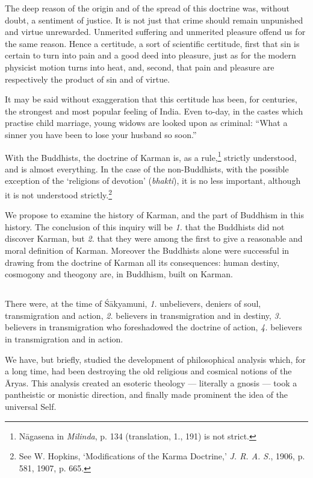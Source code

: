 \documentclass[a4paper, 11pt, oneside, english, landscape]{article}
\begin{document}
The deep reason of the origin and of the spread of this doctrine was, without doubt, a sentiment of justice. It is not just that crime should remain unpunished and virtue unrewarded. Unmerited suffering and unmerited pleasure offend us for the same reason. Hence a certitude, a sort of scientific certitude, first that sin is certain to turn into pain and a good deed into pleasure, just as for the modern physicist motion turns into heat, and, second, that pain and pleasure are respectively the product of sin and of virtue.

It may be said without exaggeration that this certitude has been, for centuries, the strongest and most popular feeling of India. Even to-day, in the castes which practise child marriage, young widows are looked upon as criminal: ``What a sinner you have been to lose your husband so soon.''

With the Buddhists, the doctrine of Karman is, as a rule,\footnote{Nāgasena in \emph{Milinda}, p. 134 (translation, 1., 191) is not strict.} strictly understood, and is almost everything. In the case of the non-Buddhists, with the possible exception of the `religions of devotion' (\emph{bhakti}), it is no less important, although it is not understood strictly.\footnote{See W. Hopkins, `Modifications of the Karma Doctrine,' \emph{J. R. A. S.}, 1906, p. 581, 1907, p. 665.}

We propose to examine the history of Karman, and the part of Buddhism in this history. The conclusion of this inquiry will be \emph{1.} that the Buddhists did not discover Karman, but \emph{2.} that they were among the first to give a reasonable and moral definition of Karman. Moreover the Buddhists alone were successful in drawing from the doctrine of Karman all its consequences: human destiny, cosmogony and theogony are, in Buddhism, built on Karman.

\subsection{}
\paragraph{}
There were, at the time of Śākyamuni, \emph{1.} unbelievers, deniers of soul, transmigration and action, \emph{2.} believers in transmigration and in destiny, \emph{3.} believers in transmigration who foreshadowed the doctrine of action, \emph{4.} believers in transmigration and in action.

We have, but briefly, studied the development of philosophical analysis which, for a long time, had been destroying the old religious and cosmical notions of the Āryas. This analysis created an esoteric theology --- literally a gnosis --- took a pantheistic or monistic direction, and finally made prominent the idea of the universal Self.
\end{document}
